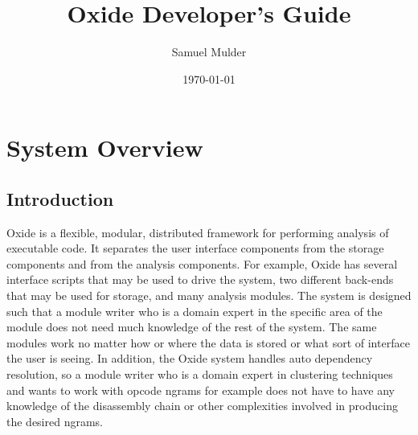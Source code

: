 \documentclass{book}
\begin{document}
\title{ Oxide Developer's Guide }
\author{ Samuel Mulder }
\date{\today}
\maketitle

\chapter{System Overview}

\section{Introduction}
Oxide is a flexible, modular, distributed framework for performing analysis of executable code.  It separates the user interface components from the storage components and from the analysis components.  For example, Oxide has several interface scripts that may be used to drive the system, two different back-ends that may be used for storage, and many analysis modules.  The system is designed such that a module writer who is a domain expert in the specific area of the module does not need much knowledge of the rest of the system.  The same modules work no matter how or where the data is stored or what sort of interface the user is seeing.  In addition, the Oxide system handles auto dependency resolution, so a module writer who is a domain expert in clustering techniques and wants to work with opcode ngrams for example does not have to have any knowledge of the disassembly chain or other complexities involved in producing the desired ngrams. 
\end{document}
